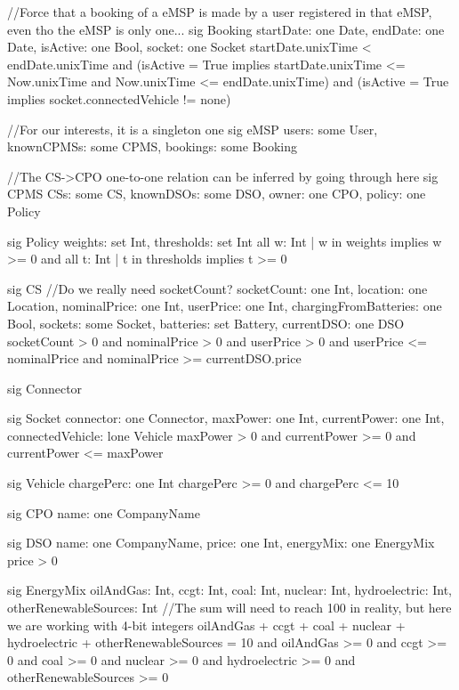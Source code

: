 \documentclass[11pt]{article}
\begin{document}
\begin{ffcode}
    
    //Force that a booking of a eMSP is made by a user registered in that eMSP, even tho the eMSP is only one...
    sig Booking {
    	startDate: one Date,
    	endDate: one Date,
    	isActive: one Bool,
    	socket: one Socket
    } {
    	startDate.unixTime < endDate.unixTime
    	and (isActive = True implies startDate.unixTime <= Now.unixTime and Now.unixTime <= endDate.unixTime)
    	and (isActive = True implies socket.connectedVehicle != none)
    }
    
    //For our interests, it is a singleton
    one sig eMSP {
    	users: some User,
    	knownCPMSs: some CPMS,
    	bookings: some Booking
    }
    
    //The CS->CPO one-to-one relation can be inferred by going through here
    sig CPMS {
    	CSs: some CS,
    	knownDSOs: some DSO,
    	owner: one CPO,
    	policy: one Policy
    }
    
    sig Policy {
    	weights: set Int,
    	thresholds: set Int
    } {
    	all w: Int | w in weights implies w >= 0
    	and all t: Int | t in thresholds implies t >= 0
    }
    
    sig CS {
    	//Do we really need socketCount?
    	socketCount: one Int,
    	location: one Location,
    	nominalPrice: one Int,
    	userPrice: one Int,
    	chargingFromBatteries: one Bool,
    	sockets: some Socket,
    	batteries: set Battery,
    	currentDSO: one DSO
    } {
    	socketCount > 0
    	and nominalPrice > 0
    	and userPrice > 0
    	and userPrice <= nominalPrice
    	and nominalPrice >= currentDSO.price
    }
    
    sig Connector {}
    
    sig Socket {
    	connector: one Connector,
    	maxPower: one Int,
    	currentPower: one Int,
    	connectedVehicle: lone Vehicle
    } {
    	maxPower > 0
    	and currentPower >= 0
    	and currentPower <= maxPower
    }
    
    sig Vehicle {
    	chargePerc: one Int
    } {
    	chargePerc >= 0 and chargePerc <= 10
    }
    
    sig CPO {
    	name: one CompanyName
    }
    
    sig DSO {
    	name: one CompanyName,
    	price: one Int,
    	energyMix: one EnergyMix
    } {
    	price > 0
    }
    
    sig EnergyMix {
    	oilAndGas: Int,
    	ccgt: Int,
    	coal: Int,
    	nuclear: Int,
    	hydroelectric: Int,
    	otherRenewableSources: Int
    } {
    	//The sum will need to reach 100 in reality, but here we are working with 4-bit integers
    	oilAndGas + ccgt + coal + nuclear + hydroelectric + otherRenewableSources = 10
    	and oilAndGas >= 0
    	and ccgt >= 0
    	and coal >= 0
    	and nuclear >= 0
    	and hydroelectric >= 0
    	and otherRenewableSources >= 0
    }
    

\end{ffcode}
\end{document}
